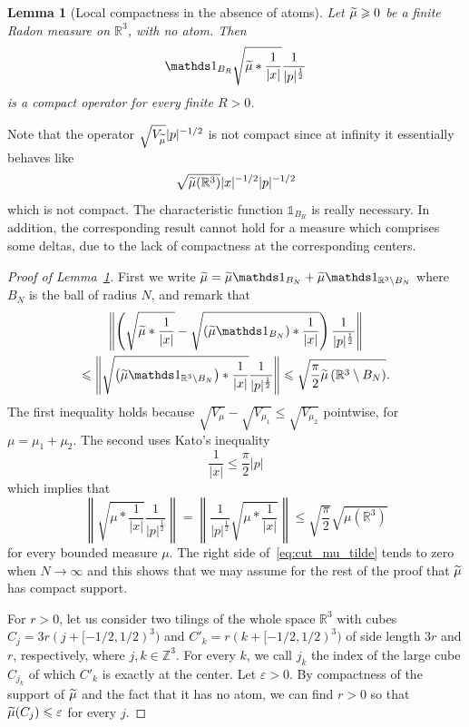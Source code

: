 \documentclass[10pt]{amsart}
\newtheorem{lemm}[cdrthm]{Lemma}
\theoremstyle{definition}
\newcommand{\R}{\mathbb{R}}
\newcommand{\Z}{\mathbb{Z}}
\newcommand\1{{\ensuremath {\mathds 1} }}
\newcommand{\ii}{\infty}
\newcommand{\norm}[1]{ \left\| #1 \right\|}
\renewcommand{\geq}{\geqslant}
\renewcommand{\leq}{\leqslant}
\renewcommand{\tilde}{\widetilde}
\newcommand{\eps}{\varepsilon}
\let\oldtilde\tilde
\renewcommand*{\tilde}[1]{\mathchoice{\widetilde{#1}}{\widetilde{#1}}{\oldtilde{#1}}{\oldtilde{#1}}}
\begin{document}
\begin{lemm}[Local compactness in the absence of atoms]\label{lem:compactness-no-atom}
Let $\tilde\mu\geq0$ be a finite Radon measure on $\R^3$, with no atom. Then
\[
\1_{B_R}\sqrt{\tilde\mu\ast\frac1{|x|}}\frac{1}{|p|^{\frac12}}
\]
is a compact operator for every finite $R>0$.
\end{lemm}

Note that the operator $\sqrt{V_{\tilde\mu}}|p|^{-1/2}$ is not compact since at infinity it essentially behaves like
\[
\sqrt{\tilde\mu(\R^3)}|x|^{-1/2}|p|^{-1/2}
\]
which is not compact. The characteristic function $\1_{B_R}$ is really necessary. In addition, the corresponding result cannot hold for a measure which comprises some deltas, due to the lack of compactness at the corresponding centers.

\begin{proof}[Proof of Lemma~\ref{lem:compactness-no-atom}]
First we write $\tilde\mu=\tilde\mu \1_{B_N}+\tilde\mu \1_{\R^3\setminus B_N}$ where $B_N$ is the ball of radius $N$, and remark that
\begin{multline}\label{eq:cut_mu_tilde}
\norm{\left(\sqrt{\tilde\mu\ast\frac1{|x|}}-\sqrt{\left(\tilde\mu\1_{B_N}\right) \ast\frac1{|x|}}\right)\frac{1}{|p|^{\frac12}}}\\
\leq \norm{\sqrt{\left(\tilde\mu\1_{\R^3\setminus B_N}\right)\ast\frac1{|x|}}\frac{1}{|p|^{\frac12}}}\leq \sqrt{\frac\pi2 \tilde\mu\left(\R^3\setminus B_N\right)}.
\end{multline}
The first inequality holds because $\sqrt{V_{\mu}}-\sqrt{V_{\mu_1}}\leq \sqrt{V_{\mu_2}}$ pointwise, for $\mu=\mu_1+\mu_2$. The second uses Kato's inequality
\begin{equation}\label{eq:Kato}
\frac{1}{|x|}\leq\frac\pi2 |p|
\end{equation}
which implies that
\[
\norm{\sqrt{\mu\ast\frac1{|x|}}\frac1{|p|^{\frac12}}}=\norm{\frac1{|p|^{\frac12}}\sqrt{\mu\ast\frac1{|x|}}}\leq \sqrt{\frac\pi2}\sqrt{\mu\left(\R^3\right)}
\]
for every bounded measure $\mu$. The right side of~\eqref{eq:cut_mu_tilde} tends to zero when $N\to\ii$ and this shows that we may assume for the rest of the proof that $\tilde\mu$ has compact support.

For $r>0$, let us consider two tilings of the whole space $\R^3$ with cubes $C_j=3r(j+[-1/2,1/2)^3)$ and $C'_k=r(k+[-1/2,1/2)^3)$ of side length $3r$ and $r$, respectively, where $j,k\in\Z^3$. For every $k$, we call $j_k$ the index of the large cube $C_{j_k}$ of which $C'_k$ is exactly at the center. Let $\eps>0$. By compactness of the support of $\tilde\mu$ and the fact that it has no atom, we can find $r>0$ so that $\tilde\mu(C_j)\leq\eps$ for every $j$.


\end{proof}
\end{document}
